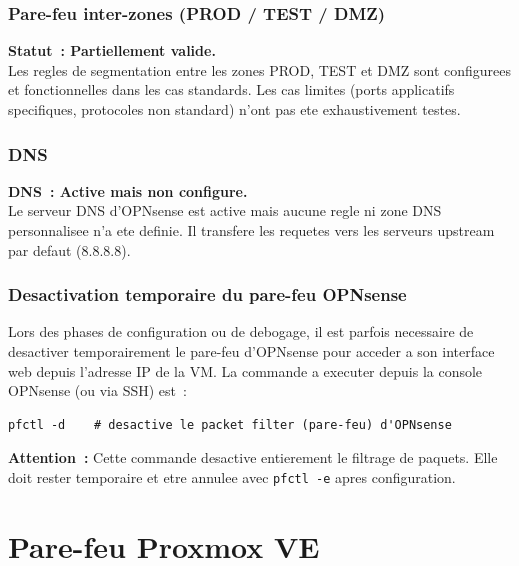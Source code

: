 \documentclass[a4paper,11pt]{article}
\newenvironment{warnbox}{%
  \begin{mdframed}[linecolor=orange,backgroundcolor=orange!8,linewidth=1pt,
    leftmargin=0pt,rightmargin=0pt,innertopmargin=6pt,innerbottommargin=6pt]
}{%
  \end{mdframed}
}
\begin{document}
\subsubsection{Pare-feu inter-zones (PROD / TEST / DMZ)}

\begin{warnbox}
  \textbf{Statut~: Partiellement valide.}\\
  Les regles de segmentation entre les zones PROD, TEST et DMZ sont configurees
  et fonctionnelles dans les cas standards. Les cas limites (ports applicatifs
  specifiques, protocoles non standard) n'ont pas ete exhaustivement testes.
\end{warnbox}

\subsubsection{DNS}

\begin{warnbox}
  \textbf{DNS~: Active mais non configure.}\\
  Le serveur DNS d'OPNsense est active mais aucune regle ni zone DNS personnalisee
  n'a ete definie. Il transfere les requetes vers les serveurs upstream par defaut
  (8.8.8.8).
\end{warnbox}

\subsubsection{Desactivation temporaire du pare-feu OPNsense}

Lors des phases de configuration ou de debogage, il est parfois necessaire de
desactiver temporairement le pare-feu d'OPNsense pour acceder a son interface
web depuis l'adresse IP de la VM. La commande a executer depuis la console
OPNsense (ou via SSH) est~:

\begin{lstlisting}[style=shellstyle]
pfctl -d    # desactive le packet filter (pare-feu) d'OPNsense
\end{lstlisting}

\textbf{Attention~:} Cette commande desactive entierement le filtrage de paquets.
Elle doit rester temporaire et etre annulee avec \texttt{pfctl -e} apres configuration.

\section{Pare-feu Proxmox VE}
\end{document}
